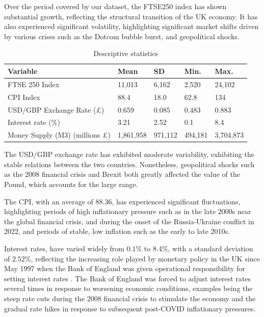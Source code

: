 \documentclass[11pt,a4paper]{article}
\begin{document}
Over the period covered by our dataset, the FTSE250 index has 
shown substantial growth, reflecting the structural transition of the UK economy.
It has also experienced significant volatility, highlighting significant market shifts driven by 
various crises such as the Dotcom bubble burst, and geopolitical shocks.

\begin{table}[h!]
    \centering
    \caption{Descriptive statistics}
    \begin{tabular}{lllll}
        \toprule
        \textbf{Variable} & \textbf{Mean} & \textbf{SD} &  \textbf{Min.} & \textbf{Max.}\\
        \midrule
        FTSE 250 Index &  11,013 & 6,162 & 2,520 & 24,102 \\
        CPI Index &  88.4 & 18.0 & 62.8 & 134 \\
        USD/GBP Exchange Rate (£) &  0.659 & 0.085 & 0.483 & 0.883 \\
        Interest rate ($\%$) &  3.21 & 2.52 & 0.1 & 8.4 \\
        Money Supply (M3) (millions £) &  1,861,958 & 971,112 & 494,181 & 3,704,873 \\
        \bottomrule
    \end{tabular}
\end{table}


The USD/GBP exchange rate has exhibited moderate variability, exhibiting the stable relations between 
the two countries. Nonetheless, geopolitical shocks such as the 2008 financial crisis and Brexit both greatly affected the value of the Pound, 
which accounts for the large range. 

The CPI, with an average of 88.36, has 
experienced significant fluctuations, highlighting periods of high inflationary pressure such as in the late 2000s 
near the global financial crisis, and during the onset of the Russia-Ukraine conflict in 2022, and periods of stable, low
inflation such as the early to late 2010s.

Interest rates, have varied widely from $0.1\%$ to $8.4\%$, with a standard deviation of $2.52\%$, reflecting the 
increasing role played by monetary policy in the UK since May 1997 when the Bank of England was given operational responsibility for setting interest rates \citep{king1997changes}. The Bank of England was forced to adjust interest rates 
several times in response to worsening economic conditions, examples being the steep rate cuts during the 2008 financial crisis to stimulate the economy and the gradual rate hikes in response to 
subsequent post-COVID inflationary pressures. 
\end{document}
